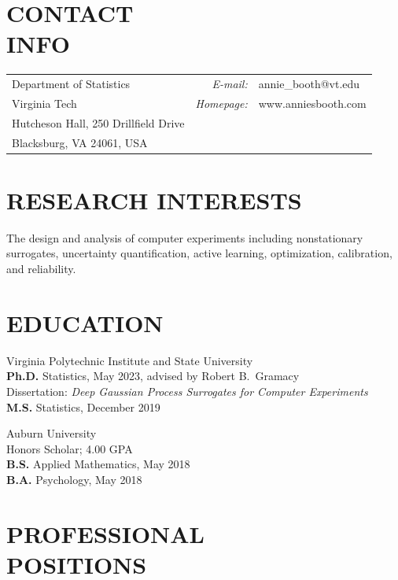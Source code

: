 \documentclass[margin,line,11pt]{res}
\begin{document}

\begin{resume}


\vspace{-0.1cm}
\section{\bf CONTACT\\INFO}
\vspace{.05in}
\begin{tabular}{@{}p{2.7in}rp{2in}}
Department of Statistics  & {\it E-mail:} & annie\_booth@vt.edu \\            
Virginia Tech & {\it Homepage:} & www.anniesbooth.com \\   
Hutcheson Hall, 250 Drillfield Drive \\     
Blacksburg, VA 24061, USA  
\end{tabular}

\medskip
\section{\bf RESEARCH INTERESTS}

The design and analysis of computer experiments including nonstationary surrogates, 
uncertainty quantification, active learning, optimization, calibration, and reliability.

\medskip
\section{\bf EDUCATION}

{\sc Virginia Polytechnic Institute and State University} \\
{\bf Ph.D.} Statistics, May 2023, advised by Robert B.~Gramacy \\
Dissertation: {\it Deep Gaussian Process Surrogates for Computer Experiments} \\
{\bf M.S.} Statistics, December 2019 

{\sc Auburn University} \\
Honors Scholar; 4.00 GPA \\
{\bf B.S.} Applied Mathematics, May 2018 \\
{\bf B.A.} Psychology, May 2018

\medskip
\section{\bf PROFESSIONAL \\ POSITIONS}


\end{resume}
\end{document}
